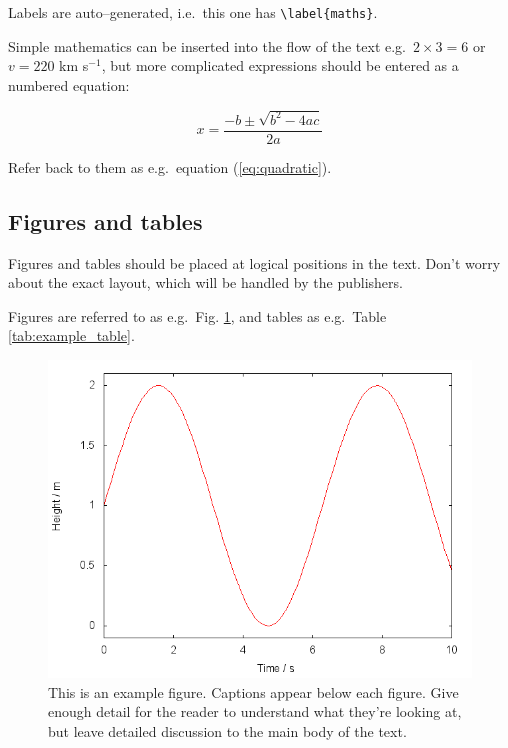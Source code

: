 \documentclass[a4paper,fleqn,usenatbib]{mnras}
\begin{document}
Labels are auto--generated, i.e.~this one has
\texttt{\textbackslash{}label\{maths\}}.

Simple mathematics can be inserted into the flow of the text
e.g.~\(2\times3=6\) or \(v=220\) km s\(^{-1}\), but more complicated
expressions should be entered as a numbered equation:

\begin{equation}
  x=\frac{-b\pm\sqrt{b^2-4ac}}{2a}
  \label{eq:quadratic}
\end{equation}

Refer back to them as e.g.~equation (\ref{eq:quadratic}).

\hypertarget{figures-and-tables}{%
\subsection{Figures and tables}\label{figures-and-tables}}

Figures and tables should be placed at logical positions in the text.
Don't worry about the exact layout, which will be handled by the
publishers.

Figures are referred to as e.g.~Fig. \ref{fig:example_figure}, and
tables as e.g.~Table \ref{tab:example_table}.

\begin{figure}
  \includegraphics[width=\columnwidth]{example}
    \caption{This is an example figure. Captions appear below each figure.
  Give enough detail for the reader to understand what they're looking at,
  but leave detailed discussion to the main body of the text.}
    \label{fig:example_figure}
\end{figure}
\end{document}
